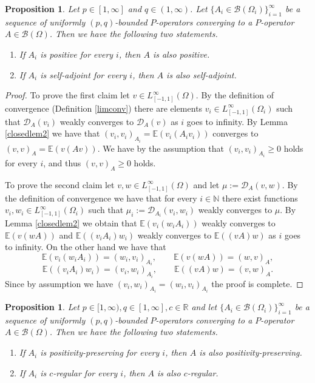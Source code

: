 \documentclass[a4wider]{amsart}
\newtheorem{proposition}[theorem]{Proposition}
\theoremstyle{definitionbreak}\newtheorem{D}[theorem]{Definition}
\theoremstyle{definitionbreak}\newtheorem*{D*}{Definition}
\begin{document}
\begin{proposition}\label{closedprop} Let $p\in[1,\infty]$ and $q\in (1,\infty)$. Let $\{A_i\in\mathcal{B}(\Omega_i)\}_{i=1}^\infty$ be a sequence of uniformly $(p,q)$-bounded  $P$-operators converging to a $P$-operator $A\in\mathcal{B}(\Omega)$. Then we have the following two statements.
\begin{enumerate}
\item If $A_i$ is positive for every $i$, then $A$ is also positive.
\item If $A_i$ is self-adjoint for every $i$, then $A$ is also self-adjoint.
\end{enumerate}
\end{proposition}

\begin{proof} To prove the first claim let $v\in L^\infty_{[-1,1]}(\Omega)$. By the definition of convergence (Definition \ref{limconv}) there are elements $v_i\in L^\infty_{[-1,1]}(\Omega_i)$  such that $\mathcal{D}_A(v_i)$ weakly converges to $\mathcal{D}_A(v)$ as $i$ goes to infinity. By Lemma \ref{closedlem2} we have that $(v_i,v_i)_{A_i}=\mathbb{E}(v_i(A_iv_i))$ converges to $(v,v)_A=\mathbb{E}(v(Av))$. We have by the  assumption that $(v_i,v_i)_{A_i}\geq 0$ holds for every $i$, and thus $(v,v)_A\geq 0$ holds. 

To prove the second claim let $v,w\in L^\infty_{[-1,1]}(\Omega)$ and let $\mu:=\mathcal{D}_A(v,w)$. By the definition of convergence we have that for every $i\in\mathbb{N}$ there exist functions $v_i,w_i\in L_{[-1,1]}^\infty(\Omega_i)$ such that $\mu_i:=\mathcal{D}_{A_i}(v_i,w_i)$ weakly converges to $\mu$.  By Lemma \ref{closedlem2} we obtain that $\mathbb{E}(v_i(w_iA_i))$ weakly converges to $\mathbb{E}(v(wA))$ and $\mathbb{E}((v_iA_i)w_i)$ weakly converges to $\mathbb{E}((vA)w)$ as $i$ goes to infinity. On the other hand we have that $$\mathbb{E}(v_i(w_iA_i))=(w_i,v_i)_{A_i},\qquad \mathbb{E}(v(wA))=(w,v)_A,$$ $$\mathbb{E}((v_iA_i)w_i)=(v_i,w_i)_{A_i},\qquad \mathbb{E}((vA)w)=(v,w)_A.$$
Since by assumption we have $(v_i,w_i)_{A_i}=(w_i,v_i)_{A_i}$ the proof is complete. 
\end{proof} 

\begin{proposition}\label{closedprop2} Let $p\in [1,\infty),q\in [1,\infty],c\in\mathbb{R}$ and let $\{A_i\in\mathcal{B}(\Omega_i)\}_{i=1}^\infty$ be a sequence of uniformly $(p,q)$-bounded  $P$-operators converging to a $P$-operator $A\in\mathcal{B}(\Omega)$. Then we have the following two statements.
\begin{enumerate}
\item If $A_i$ is positivity-preserving for every $i$, then $A$ is also positivity-preserving.
\item If $A_i$ is $c$-regular for every $i$, then $A$ is also $c$-regular.
\end{enumerate}
\end{proposition}
\end{document}
